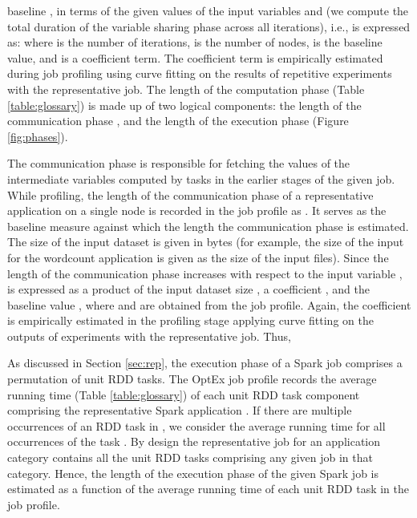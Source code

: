 \documentclass[conference]{IEEEtran}
\begin{document}
 baseline
 ,  in terms of the given values of the input variables  and
  (we compute the total duration of the variable sharing phase across all iterations), i.e.,  is expressed as:  
   where  is the number of iterations,
    is the number of nodes,  is the baseline value, and  is a coefficient term.
 The coefficient term   is empirically estimated during job profiling using curve fitting on the results of repetitive experiments with the representative job.
  The length of the computation phase  (Table \ref{table:glossary})
is made up of two logical components:
 the length of the communication phase , and the length of the execution phase
  (Figure \ref{fig:phases}). \par The communication phase is responsible for fetching the
 values of the intermediate variables computed by tasks in the
 earlier stages of the given job. While profiling, the length of the communication phase of a representative
 application  on a single node is recorded in the job profile as . It serves as the baseline measure against
  which the length the communication phase  is estimated. The size  of the input dataset is given in bytes (for example, the size of the input for the wordcount application is
 given as the size of the input files). Since the length of the communication phase  increases with respect to the input variable  \cite{Zaharia:2012:RDD:2228298.2228301},
   is expressed as a product
of the input dataset size , a coefficient , and the baseline value
, where   and  are
obtained from the job profile. Again, the coefficient  is empirically estimated in the
profiling stage applying curve fitting on the outputs of experiments with the representative job.
Thus, 
\par As discussed in Section \ref{sec:rep}, the execution phase of a Spark job comprises a permutation
 of unit RDD tasks. The OptEx job profile records the average running time
 (Table \ref{table:glossary}) of each unit RDD task component  comprising the representative Spark application . If there are multiple occurrences of an RDD task  in , we consider the
average running time for all occurrences of the task . By design the representative job for an application category
contains all the unit RDD tasks comprising any given job in that category. Hence, the
length of the execution phase of the given Spark job is estimated as a function of the average running time 
 of each unit RDD task  in the job profile.
\end{document}

